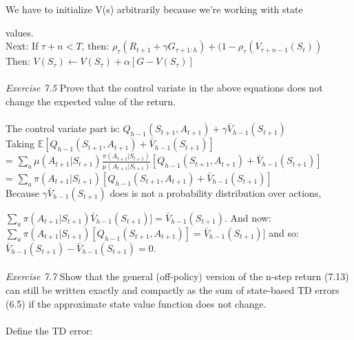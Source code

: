 \documentclass{article}
\begin{document}
We have to initialize V(s) arbitrarily because we're working with state 

values. 
\\

Next: If $\tau + n < T$, then: $\rho_{\tau}(R_{t+1} + \gamma G_{\tau+1:h}) + (1 - \rho_{\tau}(V_{\tau + n -1}(S_{t}))$ \\

Then: $V(S_{\tau}) \leftarrow V(S_{\tau}) + \alpha[G - V(S_{\tau})]$
\\\\
\textit{Exercise 7.5} Prove that the control variate in the above equations does not change the
expected value of the return.  
\\
\\

The control variate part is: \gamma$Q_{h-1}(S_{t+1}, A_{t+1}) + \gamma \bar{V}_{h-1}(S_{t+1})$
\\

Taking \gamma$\mathbb{E}[Q_{h-1}(S_{t+1}, A_{t+1}) + \bar{V}_{h-1}(S_{t+1})]$ 
\\

= $\sum_{a}\mu(A_{t+1}|S_{t+1})\frac{\pi(A_{t+1}|S_{t+1})}{\mu(A_{t+1}|S_{t+1})}[Q_{h-1}(S_{t+1}, A_{t+1}) + \bar{V}_{h-1}(S_{t+1})]$
\\

= $\sum_{a}\pi(A_{t+1}|S_{t+1})[Q_{h-1}(S_{t+1}, A_{t+1}) + \bar{V}_{h-1}(S_{t+1})]$
\\

Because $\gamma \bar{V}_{h-1}(S_{t+1})$ does is not a probability distribution over actions, 

$\sum_{a}\pi(A_{t+1}|S_{t+1}) \bar{V}_{h-1}(S_{t+1})] = \bar{V}_{h-1}(S_{t+1})$. And now:
\\

$\sum_{a}\pi(A_{t+1}|S_{t+1})[Q_{h-1}(S_{t+1}, A_{t+1})] = \bar{V}_{h-1}(S_{t+1})]$ and so:
\\

$\bar{V}_{h-1}(S_{t+1}) -  \bar{V}_{h-1}(S_{t+1}) = 0.$
\\\\
\textit{Exercise 7.7} Show that the general (off-policy) version of the n-step return (7.13) can
still be written exactly and compactly as the sum of state-based TD errors (6.5) if the
approximate state value function does not change.  
\\
\\

Define the TD error: 
\end{document}
